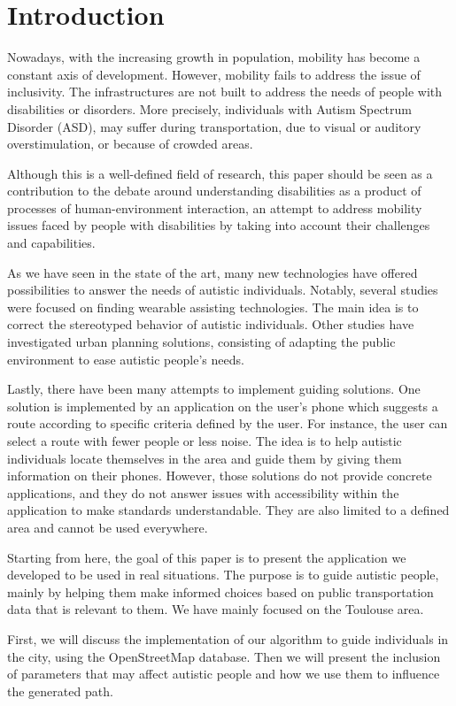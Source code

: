 \section{Introduction}


Nowadays, with the increasing growth in population, mobility has become a constant axis of development. However, mobility fails to address the issue of inclusivity. The infrastructures are not built to address the needs of people with disabilities or disorders. More precisely, individuals with Autism Spectrum Disorder (ASD), may suffer during transportation, due to visual or auditory overstimulation, or because of crowded areas.\newline


Although this is a well-defined field of research, this paper should be seen as a contribution to the debate around understanding disabilities as a product of processes of human-environment interaction, an attempt to address mobility issues faced by people with disabilities by taking into account their challenges and capabilities.\newline

As we have seen in the state of the art, many new technologies have offered possibilities to answer the needs of autistic individuals. Notably, several studies were focused on finding wearable assisting technologies. The main idea is to correct the stereotyped behavior of autistic individuals. Other studies have investigated urban planning solutions, consisting of adapting the public environment to ease autistic people's needs. \newline

Lastly, there have been many attempts to implement guiding solutions. One solution is implemented by an application on the user’s phone which suggests a route according to specific criteria defined by the user. For instance, the user can select a route with fewer people or less noise. The idea is to help autistic individuals locate themselves in the area and guide them by giving them information on their phones. However, those solutions do not provide concrete applications, and they do not answer issues with accessibility within the application to make standards understandable. They are also limited to a defined area and cannot be used everywhere.\newline


Starting from here, the goal of this paper is to present the application we developed to be used in real situations. The purpose is to guide autistic people, mainly by helping them make informed choices based on public transportation data that is relevant to them. We have mainly focused on the Toulouse area. \newline


First, we will discuss the implementation of our algorithm to guide individuals in the city, using the OpenStreetMap database. Then we will present the inclusion of parameters that may affect autistic people and how we use them to influence the generated path. 
